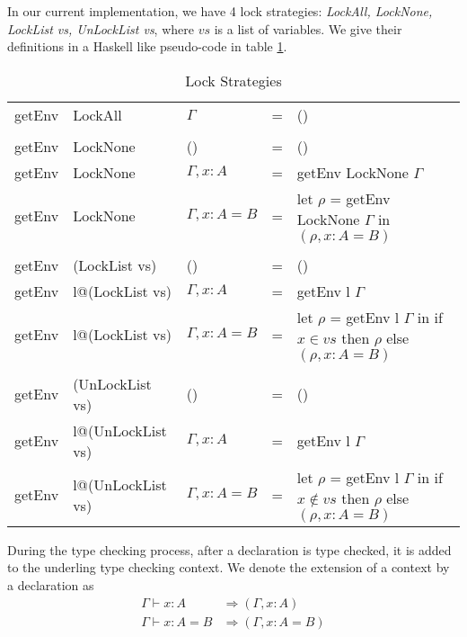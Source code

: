 \documentclass{article}
\theoremstyle{remark}
\begin{document}
In our current implementation, we have 4 lock strategies: \emph{LockAll, LockNone, LockList vs, UnLockList vs}, where $vs$ is a list of variables. We give their definitions in a Haskell like pseudo-code in table \ref{tab:lock}.
\begin{table}[h] 
  \centering
  \begin{tabular}{l l l l p{5cm}}
    getEnv & LockAll  & $\Gamma$ & = & () \\
    \\ 
    getEnv & LockNone & () & = & ()        \\
    getEnv & LockNone & $\Gamma, x : A$ & = & getEnv LockNone $\Gamma$ \\ 
    getEnv & LockNone & $\Gamma, x : A = B$ & = & let $\rho$ = getEnv LockNone $\Gamma$ \newline in $(\rho, x : A = B)$ \\
    \\ 
    getEnv & (LockList vs) & () & = & ()        \\
    getEnv & l@(LockList vs) & $\Gamma, x : A$ & = & getEnv l $\Gamma$ \\ 
    getEnv & l@(LockList vs) & $\Gamma, x : A = B$ & = & let $\rho$ = getEnv l $\Gamma$ \newline in if $x \in vs$ then $\rho$ \newline else $(\rho, x : A = B)$\\
    \\
    getEnv & (UnLockList vs) & () & = & ()        \\
    getEnv & l@(UnLockList vs) & $\Gamma, x : A$ & = & getEnv l $\Gamma$ \\ 
    getEnv & l@(UnLockList vs) & $\Gamma, x : A = B$ & = & let $\rho$ = getEnv l $\Gamma$ \newline in if $x \notin vs$ then $\rho$ \newline else $(\rho, x : A = B)$
  \end{tabular}
  \caption{Lock Strategies}
  \label{tab:lock}
\end{table}

During the type checking process, after a declaration is type checked, it is added to the underling type checking context. We denote the extension of a context by a declaration as
\begin{align*}
  \Gamma \vdash x : A &\Rightarrow (\Gamma, x : A) \\
  \Gamma \vdash x : A = B &\Rightarrow (\Gamma, x : A = B)
\end{align*}
\end{document}
